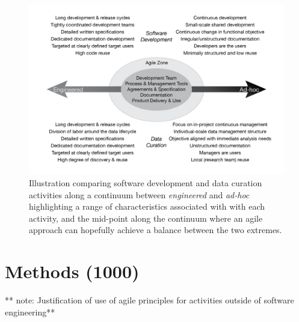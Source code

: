 \documentclass[paper]{ijdc-v9}
\begin{document}
\begin{figure}[htbp]
\centering
\includegraphics{agileComparison-01.png}
\caption{Illustration comparing software development and data curation
activities along a continuum between \emph{engineered} and \emph{ad-hoc}
highlighting a range of characteristics associated with with each
activity, and the mid-point along the continuum where an agile approach
can hopefully achieve a balance between the two extremes.}
\end{figure}

\section{Methods (1000)}\label{methods-1000}

** note: Justification of use of agile principles for activities outside
of software engineering**
\end{document}
